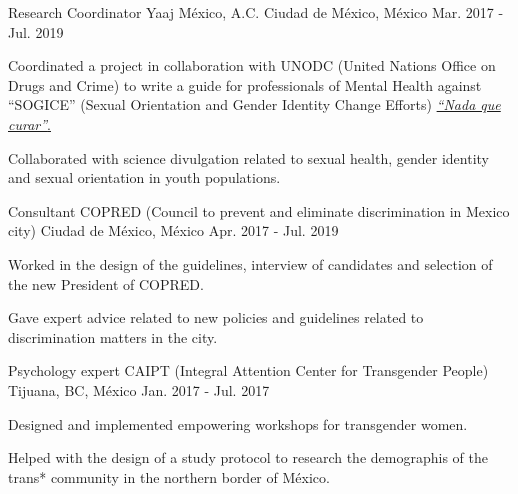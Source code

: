 \begin{cventries}
    \cventry
        {Research Coordinator}
        {Yaaj México, A.C.}
        {Ciudad de México, México}
        {Mar. 2017 - Jul. 2019}
        {
            \begin{cvitems}
            \item {Coordinated a project in collaboration with UNODC (United Nations Office on Drugs and Crime) to write a guide for professionals of Mental Health against ``SOGICE'' (Sexual Orientation and Gender Identity Change Efforts) \href{https://www.unodc.org/documents/mexicoandcentralamerica/2019/GUIAECOSIGFINAL-compressed.pdf}{\textit{``Nada que curar''}.}}
                \item {Collaborated with science divulgation related to sexual health, gender identity and sexual orientation in youth populations.}
            \end{cvitems}
        }
    \cventry
        {Consultant}
        {COPRED (Council to prevent and eliminate discrimination in Mexico city)}
        {Ciudad de México, México}
        {Apr. 2017 - Jul. 2019}
        {
            \begin{cvitems}
                \item {Worked in the design of the guidelines, interview of candidates and selection of the new President of COPRED.}
                \item {Gave expert advice related to new policies and guidelines related to discrimination matters in the city.}
            \end{cvitems}
        }
    \cventry
        {Psychology expert}
        {CAIPT (Integral Attention Center for Transgender People)}
        {Tijuana, BC, México}
        {Jan. 2017 - Jul. 2017}
        {
            \begin{cvitems}
                \item {Designed and implemented empowering workshops for transgender women.}
                \item {Helped with the design of a study protocol to research the demographis of the trans* community in the northern border of México.}
            \end{cvitems}
        }
\end{cventries}
\vspace{-3.2mm}

